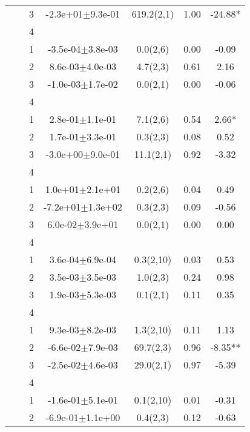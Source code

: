 \begin{longtable}{llccccS[table-format=-2.2, table-space-text-post = {***}]}
   &  & 3 & -2.3e+01$\pm$9.3e-01 & 619.2(2,1) & 1.00 & -24.88* \\ 
   &  & 4 &  &  &  &  \\ 
   \midrule
{} & {} & 1 & -3.5e-04$\pm$3.8e-03 & 0.0(2,6) & 0.00 & -0.09 \\ 
   &  & 2 &  8.6e-03$\pm$4.0e-03 & 4.7(2,3) & 0.61 & 2.16 \\ 
   &  & 3 & -1.0e-03$\pm$1.7e-02 & 0.0(2,1) & 0.00 & -0.06 \\ 
   &  & 4 &  &  &  &  \\ 
   \midrule
{} & {} & 1 &  2.8e-01$\pm$1.1e-01 & 7.1(2,6) & 0.54 & 2.66* \\ 
   &  & 2 &  1.7e-01$\pm$3.3e-01 & 0.3(2,3) & 0.08 & 0.52 \\ 
   &  & 3 & -3.0e+00$\pm$9.0e-01 & 11.1(2,1) & 0.92 & -3.32 \\ 
   &  & 4 &  &  &  &  \\ 
   \midrule
{} & {} & 1 &  1.0e+01$\pm$2.1e+01 & 0.2(2,6) & 0.04 & 0.49 \\ 
   &  & 2 & -7.2e+01$\pm$1.3e+02 & 0.3(2,3) & 0.09 & -0.56 \\ 
   &  & 3 &  6.0e-02$\pm$3.9e+01 & 0.0(2,1) & 0.00 & 0.00 \\ 
   &  & 4 &  &  &  &  \\ 
   \midrule
{} & {} & 1 &  3.6e-04$\pm$6.9e-04 & 0.3(2,10) & 0.03 & 0.53 \\ 
   &  & 2 &  3.5e-03$\pm$3.5e-03 & 1.0(2,3) & 0.24 & 0.98 \\ 
   &  & 3 &  1.9e-03$\pm$5.3e-03 & 0.1(2,1) & 0.11 & 0.35 \\ 
   &  & 4 &  &  &  &  \\ 
   \midrule
{} & {} & 1 &  9.3e-03$\pm$8.2e-03 & 1.3(2,10) & 0.11 & 1.13 \\ 
   &  & 2 & -6.6e-02$\pm$7.9e-03 & 69.7(2,3) & 0.96 & -8.35** \\ 
   &  & 3 & -2.5e-02$\pm$4.6e-03 & 29.0(2,1) & 0.97 & -5.39 \\ 
   &  & 4 &  &  &  &  \\ 
   \midrule
{} & {} & 1 & -1.6e-01$\pm$5.1e-01 & 0.1(2,10) & 0.01 & -0.31 \\ 
   &  & 2 & -6.9e-01$\pm$1.1e+00 & 0.4(2,3) & 0.12 & -0.63 \\ 

\end{longtable}
